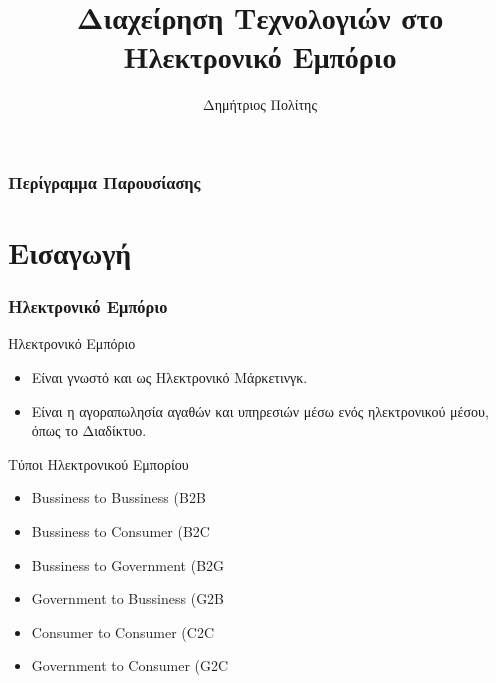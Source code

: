 \documentclass[handouts,hyperref={pdfpagelabels=false}]{beamer}
\begin{document}

\title{Διαχείρηση Τεχνολογιών στο Ηλεκτρονικό Εμπόριο}
\author{Δημήτριος Πολίτης}

\begin{frame}
\titlepage
\end{frame}

\begin{frame}
\frametitle{Περίγραμμα Παρουσίασης}
\tableofcontents
\end{frame}

\section{\foreignlanguage{greek}{Εισαγωγή}}
\begin{frame}
\frametitle{\foreignlanguage{greek}{Ηλεκτρονικό Εμπόριο}}

\begin{block}{Ηλεκτρονικό Εμπόριο}
\begin{itemize}
  \item Είναι γνωστό και ως Ηλεκτρονικό Μάρκετινγκ.
  \item Είναι η αγοραπωλησία αγαθών και υπηρεσιών μέσω ενός ηλεκτρονικού μέσου, όπως το Διαδίκτυο.
\end{itemize}
\end{block}

\begin{block}{Τύποι Ηλεκτρονικού Εμπορίου}
\begin{itemize}
  \item \textlatin{Bussiness to Bussiness  (B2B}
  \item \textlatin{Bussiness to Consumer   (B2C}
  \item \textlatin{Bussiness to Government (B2G}
  \item \textlatin{Government to Bussiness (G2B}
  \item \textlatin{Consumer to Consumer    (C2C}
  \item \textlatin{Government to Consumer  (G2C}
\end{itemize}
\end{block}
\end{frame}
\end{document}
